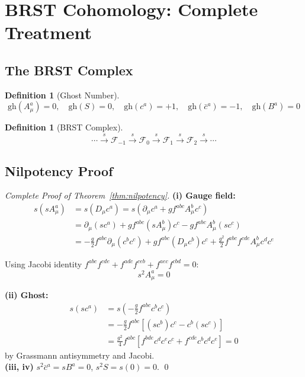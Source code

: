 \documentclass[11pt,a4paper]{article}
\theoremstyle{plain}
\theoremstyle{definition}
\newtheorem{definition}[theorem]{Definition}
\begin{document}
\section{BRST Cohomology: Complete Treatment}
\label{app:brst}

\subsection{The BRST Complex}

\begin{definition}[Ghost Number]
\begin{equation}
\mathrm{gh}(A^a_\mu) = 0, \quad
\mathrm{gh}(S) = 0, \quad
\mathrm{gh}(c^a) = +1, \quad
\mathrm{gh}(\bar{c}^a) = -1, \quad
\mathrm{gh}(B^a) = 0
\end{equation}
\end{definition}

\begin{definition}[BRST Complex]
\begin{equation}
\cdots \xrightarrow{s} \mathcal{F}_{-1} \xrightarrow{s} \mathcal{F}_0
\xrightarrow{s} \mathcal{F}_1 \xrightarrow{s} \mathcal{F}_2 \xrightarrow{s} \cdots
\end{equation}
\end{definition}

\subsection{Nilpotency Proof}

\begin{proof}[Complete Proof of Theorem~\ref{thm:nilpotency}]
\textbf{(i) Gauge field:}
\begin{align}
s(sA^a_\mu) &= s(D_\mu c^a) = s(\partial_\mu c^a + gf^{abc}A^b_\mu c^c) \\
&= \partial_\mu(sc^a) + gf^{abc}(sA^b_\mu)c^c - gf^{abc}A^b_\mu(sc^c) \\
&= -\frac{g}{2}f^{abc}\partial_\mu(c^b c^c) + gf^{abc}(D_\mu c^b)c^c
   + \frac{g^2}{2}f^{abc}f^{cde}A^b_\mu c^d c^e
\end{align}

Using Jacobi identity $f^{abc}f^{cde} + f^{adc}f^{ceb} + f^{aec}f^{cbd} = 0$:
\begin{equation}
s^2 A^a_\mu = 0
\end{equation}

\textbf{(ii) Ghost:}
\begin{align}
s(sc^a) &= s\left(-\frac{g}{2}f^{abc}c^b c^c\right) \\
&= -\frac{g}{2}f^{abc}\left[(sc^b)c^c - c^b(sc^c)\right] \\
&= \frac{g^2}{4}f^{abc}\left[f^{bde}c^d c^e c^c + f^{cde}c^b c^d c^e\right] = 0
\end{align}
by Grassmann antisymmetry and Jacobi.
\vspace{0.3em}\\
\textbf{(iii, iv)} $s^2\bar{c}^a = sB^a = 0$, $s^2 S = s(0) = 0$. \qed
\end{proof}
\end{document}
